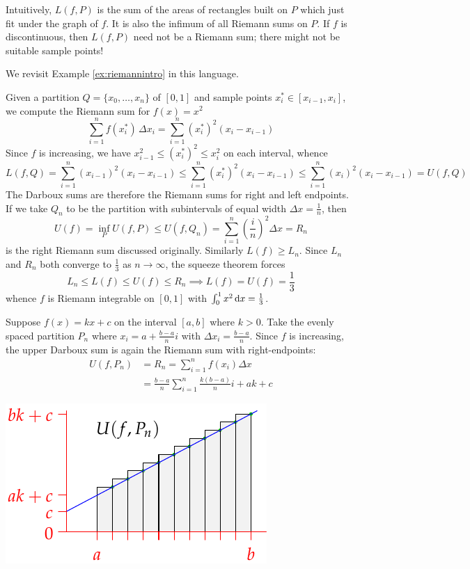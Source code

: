 Intuitively, $L(f,P)$ is the sum of the areas of rectangles built on $P$ which just fit under the graph of $f$. It is also the infimum of all Riemann sums on $P$. If $f$ is discontinuous, then $L(f,P)$ need not be a Riemann sum; there might not be suitable sample points!

\goodbreak

\begin{examples}{}{}
\exstart We revisit Example \ref{ex:riemannintro} in this language.
\begin{enumerate}\setcounter{enumi}{1}
  \item[]Given a partition $Q=\{x_0,\ldots,x_n\}$ of $[0,1]$ and sample points $x_i^*\in[x_{i-1},x_i]$, we compute the Riemann sum for $f(x)=x^2$
	\[\sum_{i=1}^nf(x_i^*)\,\Delta x_i=\sum_{i=1}^n(x_i^*)^2(x_i-x_{i-1})\]
	Since $f$ is increasing,  we have $x_{i-1}^2\le (x_i^*)^2\le x_i^2$ on each interval, whence
	\[L(f,Q)=\sum_{i=1}^n(x_{i-1})^2(x_i-x_{i-1})
		\le \sum_{i=1}^n(x_i^*)^2(x_i-x_{i-1})
		\le\sum_{i=1}^n(x_i)^2(x_i-x_{i-1})=U(f,Q)\]
	The Darboux sums are therefore the Riemann sums for right and left endpoints.\smallbreak
	If we take $Q_n$ to be the partition with subintervals of equal width $\Delta x=\frac 1n$, then
	\[U(f)=\inf_P U(f,P)\le U(f,Q_n)=\sum_{i=1}^n\left(\frac in\right)^2\!\Delta x=R_n\]
	is the right Riemann sum discussed originally. Similarly $L(f)\ge L_n$. Since $L_n$ and $R_n$ both converge to $\frac 13$ as $n\to \infty$, the squeeze theorem forces
	\[L_n\le L(f)\le U(f)\le R_n\implies L(f)=U(f)=\frac 13\]
	whence $f$ is Riemann integrable on $[0,1]$ with $\int_0^1x^2\,{\mathrm{d} x}=\frac 13$.

\begin{minipage}[t]{0.55\linewidth}\vspace{0pt}
\item Suppose $f(x)=kx+c$ on the interval $[a,b]$ where $k>0$. Take the evenly spaced partition $P_n$ where $x_i=a+\frac{b-a}ni$ with $\Delta x_i=\frac{b-a}n$. Since $f$ is increasing, the upper Darboux sum is again the Riemann sum with right-endpoints:
	\begin{align*}
	U(f,P_n)&=R_n=\sum_{i=1}^nf(x_i)\Delta x\\
	&=\frac{b-a}n\sum_{i=1}^n\frac{k(b-a)}ni+ak+c
	\end{align*}
\end{minipage}\begin{minipage}[t]{0.45\linewidth}\vspace{0pt}
\flushright\includegraphics{darboux-triangle}
\end{minipage}\vspace{-5pt}
  

\end{enumerate}
\end{examples}
